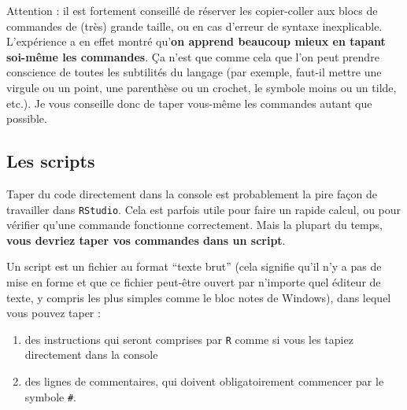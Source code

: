 \documentclass[
  letterpaper,
  DIV=11,
  numbers=noendperiod]{scrreprt}
\providecommand{\tightlist}{%
  \setlength{\itemsep}{0pt}\setlength{\parskip}{0pt}}\usepackage{longtable,booktabs,array}
\begin{document}
\begin{tcolorbox}[enhanced jigsaw, bottomtitle=1mm, title=\textcolor{quarto-callout-warning-color}{\faExclamationTriangle}\hspace{0.5em}{Les risques du ``copier-coller'' {\faIcon{regular}}}, breakable, opacitybacktitle=0.6, coltitle=black, opacityback=0, toprule=.15mm, toptitle=1mm, titlerule=0mm, colback=white, rightrule=.15mm, arc=.35mm, leftrule=.75mm, bottomrule=.15mm, left=2mm, colframe=quarto-callout-warning-color-frame, colbacktitle=quarto-callout-warning-color!10!white]
Attention : il est fortement conseillé de réserver les copier-coller aux
blocs de commandes de (très) grande taille, ou en cas d'erreur de
syntaxe inexplicable. L'expérience a en effet montré qu'\textbf{on
apprend beaucoup mieux {en tapant soi-même les commandes}}. Ça n'est que
comme cela que l'on peut prendre conscience de toutes les subtilités du
langage (par exemple, faut-il mettre une virgule ou un point, une
parenthèse ou un crochet, le symbole moins ou un tilde, etc.). Je vous
conseille donc de taper vous-même les commandes autant que possible.
\end{tcolorbox}

\hypertarget{sec-script}{%
\subsection{Les scripts}\label{sec-script}}

Taper du code directement dans la console est probablement la pire façon
de travailler dans \texttt{RStudio}. Cela est parfois utile pour faire
un rapide calcul, ou pour vérifier qu'une commande fonctionne
correctement. Mais la plupart du temps, \textbf{vous devriez taper vos
commandes dans un script}.

\begin{tcolorbox}[enhanced jigsaw, bottomtitle=1mm, title=\textcolor{quarto-callout-important-color}{\faExclamation}\hspace{0.5em}{Définition importante !}, breakable, opacitybacktitle=0.6, coltitle=black, opacityback=0, toprule=.15mm, toptitle=1mm, titlerule=0mm, colback=white, rightrule=.15mm, arc=.35mm, leftrule=.75mm, bottomrule=.15mm, left=2mm, colframe=quarto-callout-important-color-frame, colbacktitle=quarto-callout-important-color!10!white]

Un script est un fichier au format ``texte brut'' (cela signifie qu'il
n'y a pas de mise en forme et que ce fichier peut-être ouvert par
n'importe quel éditeur de texte, y compris les plus simples comme le
bloc notes de Windows), dans lequel vous pouvez taper :

\begin{enumerate}
\def\labelenumi{\arabic{enumi}.}
\tightlist
\item
  des instructions qui seront comprises par \texttt{R} comme si vous les
  tapiez directement dans la console
\item
  des lignes de commentaires, qui doivent obligatoirement commencer par
  le symbole \texttt{\#}.
\end{enumerate}

\end{tcolorbox}
\end{document}
